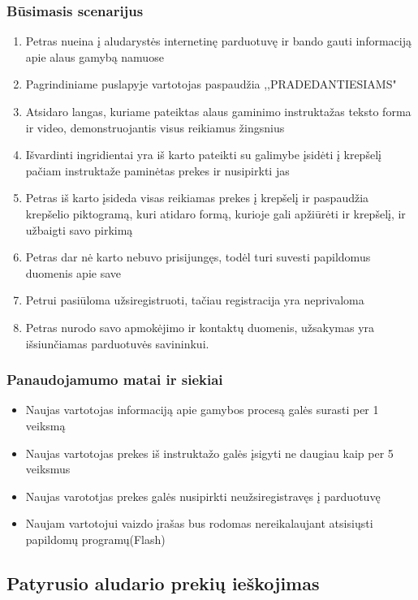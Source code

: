 \documentclass[oneside]{VUMIFPSkursinis}
\begin{document}
		\subsubsection{Būsimasis scenarijus}
			\begin{enumerate}
				\item{Petras nueina į aludarystės internetinę parduotuvę ir bando gauti informaciją apie alaus gamybą namuose}
				\item{Pagrindiniame puslapyje vartotojas paspaudžia ,,PRADEDANTIESIAMS"}
				\item{Atsidaro langas, kuriame pateiktas alaus gaminimo instruktažas teksto forma ir video, demonstruojantis visus reikiamus žingsnius}
				\item{Išvardinti ingridientai yra iš karto pateikti su galimybe įsidėti į krepšelį pačiam instruktaže paminėtas prekes ir nusipirkti jas}
				\item{Petras iš karto įsideda visas reikiamas prekes į krepšelį ir paspaudžia krepšelio piktogramą, kuri atidaro formą, kurioje gali apžiūrėti ir krepšelį, ir užbaigti savo pirkimą}
				\item{Petras dar nė karto nebuvo prisijungęs, todėl turi suvesti papildomus duomenis apie save}
				\item{Petrui pasiūloma užsiregistruoti, tačiau registracija yra neprivaloma}
				\item{Petras nurodo savo apmokėjimo ir kontaktų duomenis, užsakymas yra išsiunčiamas parduotuvės savininkui.}
			\end{enumerate}
		\subsubsection{Panaudojamumo matai ir siekiai}
			\begin{itemize}
				\item{Naujas vartotojas informaciją apie gamybos procesą galės surasti per 1 veiksmą}
				\item{Naujas vartotojas prekes iš instruktažo galės įsigyti ne daugiau kaip per 5 veiksmus}
				\item{Naujas varototjas prekes galės nusipirkti neužsiregistravęs į parduotuvę}
				\item{Naujam vartotojui vaizdo įrašas bus rodomas nereikalaujant atsisiųsti papildomų programų(Flash)}
			\end{itemize}
	\subsection{Patyrusio aludario prekių ieškojimas}
\end{document}
